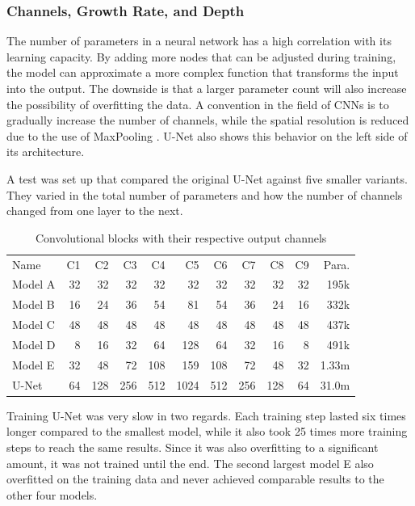 \subsubsection{Channels, Growth Rate, and Depth}

The number of parameters in a neural network has a high correlation with its learning capacity. By adding more nodes that can be adjusted during training, the model can approximate a more complex function that transforms the input into the output. The downside is that a larger parameter count will also increase the possibility of overfitting the data. A convention in the field of CNNs is to gradually increase the number of channels, while the spatial resolution is reduced due to the use of MaxPooling \cite{Krizhevsky}\cite{He2015b}\cite{Iandola2016a}\cite{Ronneberger2015a}. U-Net also shows this behavior on the left side of its architecture.

A test was set up that compared the original U-Net against five smaller variants. They varied in the total number of parameters and how the number of channels changed from one layer to the next.

\begin{table}[H]
    \centering
    \begin{tabular}{| l | r | r | r | r | r | r | r | r | r | r |}
    \hline
    Name    & C1   & C2   & C3   & C4   & C5   & C6   & C7   & C8   & C9  & Para. \\ 
    \Xhline{3\arrayrulewidth}
    Model A &   32 &   32 &   32 &   32 &   32 &   32 &   32 &   32 &  32 & 195k      \\
    \hline
    Model B &   16 &   24 &   36 &   54 &   81 &   54 &   36 &   24 &  16 & 332k      \\
    \hline
    Model C &   48 &   48 &   48 &   48 &   48 &   48 &   48 &   48 &  48 & 437k      \\
    \hline
    Model D &    8 &   16 &   32 &   64 &  128 &   64 &   32 &   16 &   8 & 491k      \\
    \hline
    Model E &   32 &   48 &   72 &  108 &  159 &  108 &   72 &   48 &  32 & 1.33m      \\
    \hline
    U-Net   &   64 &  128 &  256 &  512 & 1024 &  512 &  256 &  128 &  64 & 31.0m      \\
    \hline
    \end{tabular}
    \caption{Convolutional blocks with their respective output channels}
\end{table}

Training U-Net was very slow in two regards. Each training step lasted six times longer compared to the smallest model, while it also took 25 times more training steps to reach the same results. Since it was also overfitting to a significant amount, it was not trained until the end. The second largest model E also overfitted on the training data and never achieved comparable results to the other four models.

